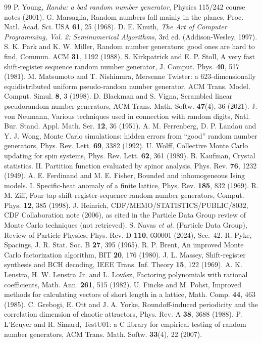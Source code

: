 \documentclass[11pt]{article}
\begin{document}
\begin{thebibliography}{99}\small
{} P. Young, \emph{Randu: a bad random number generator}, Physics 115/242 course notes (2001).
 G. Marsaglia, Random numbers fall mainly in the planes, Proc. Natl. Acad. Sci. USA \textbf{61}, 25 (1968).
 D. E. Knuth, \emph{The Art of Computer Programming, Vol. 2: Seminumerical Algorithms}, 3rd ed. (Addison-Wesley, 1997).
 S. K. Park and K. W. Miller, Random number generators: good ones are hard to find, Commun. ACM \textbf{31}, 1192 (1988).
 S. Kirkpatrick and E. P. Stoll, A very fast shift-register sequence random number generator, J. Comput. Phys. \textbf{40}, 517 (1981).
 M. Matsumoto and T. Nishimura, Mersenne Twister: a 623-dimensionally equidistributed uniform pseudo-random number generator, ACM Trans. Model. Comput. Simul. \textbf{8}, 3 (1998).
 D. Blackman and S. Vigna, Scrambled linear pseudorandom number generators, ACM Trans. Math. Softw. \textbf{47}(4), 36 (2021).
 J. von Neumann, Various techniques used in connection with random digits, Natl. Bur. Stand. Appl. Math. Ser. \textbf{12}, 36 (1951).
 A. M. Ferrenberg, D. P. Landau and Y. J. Wong, Monte Carlo simulations: hidden errors from ``good'' random number generators, Phys. Rev. Lett. \textbf{69}, 3382 (1992).
 U. Wolff, Collective Monte Carlo updating for spin systems, Phys. Rev. Lett. \textbf{62}, 361 (1989).
 B. Kaufman, Crystal statistics. II. Partition function evaluated by spinor analysis, Phys. Rev. \textbf{76}, 1232 (1949).
 A. E. Ferdinand and M. E. Fisher, Bounded and inhomogeneous Ising models. I. Specific-heat anomaly of a finite lattice, Phys. Rev. \textbf{185}, 832 (1969).
 R. M. Ziff, Four-tap shift-register-sequence random-number generators, Comput. Phys. \textbf{12}, 385 (1998).
 J. Heinrich, CDF/MEMO/STATISTICS/PUBLIC/8032, CDF Collaboration note (2006), as cited in the Particle Data Group review of Monte Carlo techniques (not retrieved).
 S. Navas \emph{et al.} (Particle Data Group), Review of Particle Physics, Phys. Rev. D \textbf{110}, 030001 (2024), Sec.~42.
 R. Pyke, Spacings, J. R. Stat. Soc. B \textbf{27}, 395 (1965).
 R. P. Brent, An improved Monte Carlo factorization algorithm, BIT \textbf{20}, 176 (1980).
 J. L. Massey, Shift-register synthesis and BCH decoding, IEEE Trans. Inf. Theory \textbf{15}, 122 (1969).
 A. K. Lenstra, H. W. Lenstra Jr. and L. Lov\'asz, Factoring polynomials with rational coefficients, Math. Ann. \textbf{261}, 515 (1982).
 U. Fincke and M. Pohst, Improved methods for calculating vectors of short length in a lattice, Math. Comp. \textbf{44}, 463 (1985).
 C. Grebogi, E. Ott and J. A. Yorke, Roundoff-induced periodicity and the correlation dimension of chaotic attractors, Phys. Rev. A \textbf{38}, 3688 (1988).
 P. L'Ecuyer and R. Simard, TestU01: a C library for empirical testing of random number generators, ACM Trans. Math. Softw. \textbf{33}(4), 22 (2007).
\end{thebibliography}
\end{document}
